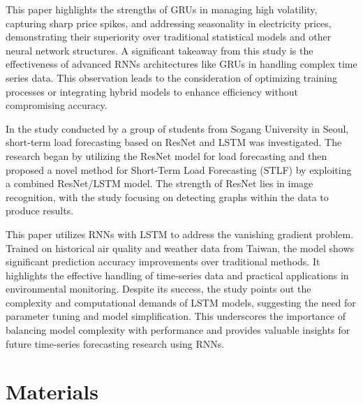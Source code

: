 \documentclass{ieeeojies}
\begin{document}
This paper \cite{b2} highlights the strengths of GRUs in managing high volatility, capturing sharp price spikes, and addressing seasonality in electricity prices, demonstrating their superiority over traditional statistical models and other neural network structures. A significant takeaway from this study is the effectiveness of advanced RNNs architectures like GRUs in handling complex time series data. This observation leads to the consideration of optimizing training processes or integrating hybrid models to enhance efficiency without compromising accuracy. 

In the study \cite{b3} conducted by a group of students from Sogang University in Seoul, short-term load forecasting based on ResNet and LSTM was investigated. The research began by utilizing the ResNet model for load forecasting and then proposed a novel method for Short-Term Load Forecasting (STLF) by exploiting a combined ResNet/LSTM model. The strength of ResNet lies in image recognition, with the study focusing on detecting graphs within the data to produce results.

This paper \cite{b4} utilizes RNNs with LSTM to address the vanishing gradient problem. Trained on historical air quality and weather data from Taiwan, the model shows significant prediction accuracy improvements over traditional methods. It highlights the effective handling of time-series data and practical applications in environmental monitoring. Despite its success, the study points out the complexity and computational demands of LSTM models, suggesting the need for parameter tuning and model simplification. This underscores the importance of balancing model complexity with performance and provides valuable insights for future time-series forecasting research using RNNs.
\section{Materials}
\end{document}
